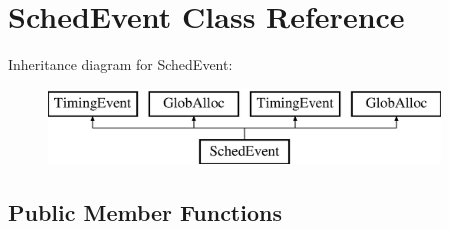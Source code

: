 \hypertarget{classSchedEvent}{\section{Sched\-Event Class Reference}
\label{classSchedEvent}
}
Inheritance diagram for Sched\-Event\-:\begin{figure}[H]
\begin{center}
\leavevmode
\includegraphics[height=2.000000cm]{classSchedEvent}
\end{center}
\end{figure}
\subsection*{Public Member Functions}

